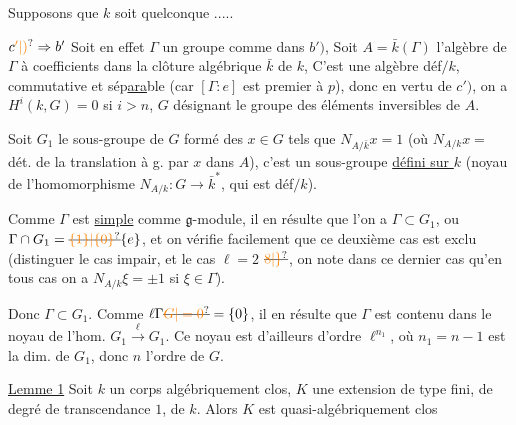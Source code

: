 Supposons que $k$ soit quelconque .....



$c\unsure{'|)}\Rightarrow b'$ Soit en effet $\Gamma$ un groupe comme dans $b')$,  Soit $A=\bar k(\Gamma)$ l'algèbre de $\Gamma$ à coefficients dans la clôture algébrique $\bar k$ de $k$,  C'est une algèbre déf$/k$, commutative et  sép\uline{ara}ble (car $[\Gamma:e]$ est premier à $p$), donc en vertu de $c')$, on a $H^i(k,G)=0$ si $i>n$, $G$ désignant le groupe des éléments inversibles de $A$.

Soit $G_1$ le sous-groupe de $G$ formé des $x\in G$ tels que $N_{A/\bar k}x=1$ (où  $N_{A/k}x=$ dét. de la translation à g. par $x$ dans $A$), c'est un sous-groupe \uline{défini sur $k$} (noyau de l'homomorphisme $N_{A/k}:G\longrightarrow\bar k^*$, qui est déf$/k$).

Comme $\Gamma$ est \uline{simple} comme $\mathfrak g$-module,  il en résulte que  l'on a $\Gamma\subset G_1$, ou $\Gamma\cap G_1=\deleted{\unsure{\{1\}|\{0\}}}\{e\}$, et on vérifie facilement que ce deuxième cas est exclu (distinguer le cas \inserted{$\ell$} impair, et le cas $\ell=2$ $\deleted{\unsure{8|\}}}$, on note  dans ce dernier cas qu'en tous cas on a $N_{A/k}\xi=\pm1$ si $\xi\in\Gamma$).

Donc $\Gamma\subset G_1$. Comme $\ell\Gamma\deleted{\unsure{G|=0}}=\{0\}$, il en résulte que $\Gamma$ est contenu dans le noyau de l'hom. $G_1\xrightarrow{\ell}G_1$. Ce noyau est d'ailleurs d'ordre $\ell^{n_1}$, où $n_1=n-1$ est la dim. de $G_1$, donc $n$ l'ordre de $G$.



\uline{Lemme 1} Soit $k$ un corps algébriquement clos, $K$ une extension de type fini, de degré de transcendance $1$, de $k$. Alors $K$ est  quasi-algébriquement clos

